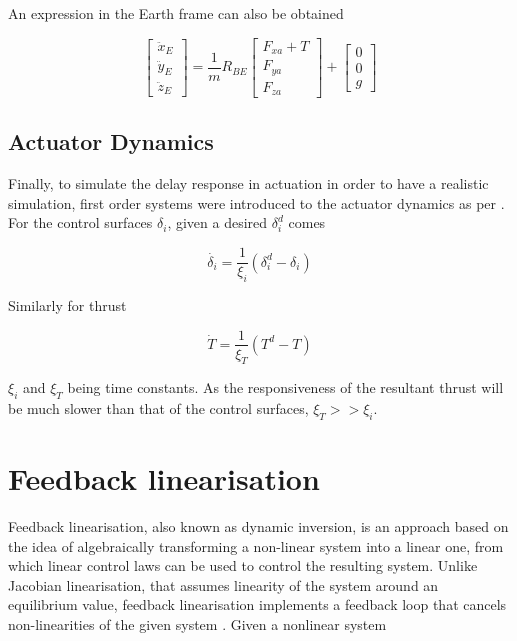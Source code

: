 An expression in the Earth frame can also be obtained

\begin{equation}
\begin{bmatrix}
\ddot{x}_E\\
\ddot{y}_E\\
\ddot{z}_E
\end{bmatrix}
= \dfrac{1}{m} R_{BE}
\begin{bmatrix}
F_{xa}+T\\
F_{ya}\\
F_{za}
\end{bmatrix}
+
\begin{bmatrix}
0\\
0\\
g
\end{bmatrix}
\end{equation}

\subsection{Actuator Dynamics}
\label{section:background/model/actuator_dynamics}

Finally, to simulate the delay response in actuation in order to have a realistic simulation, first order systems were introduced to the actuator dynamics as per \cite{hector}. For the control surfaces $\delta_i$, given a desired $\delta_i^d$ comes

\begin{equation}
\dot{\delta_i} = \dfrac{1}{\xi_i}(\delta_i^d-\delta_i)
\label{eq:actuator_dynamics}
\end{equation}

Similarly for thrust

\begin{equation}
\dot{T} = \dfrac{1}{\xi_T}(T^d-T)
\end{equation}

$\xi_i$ and $\xi_T$ being time constants. As the responsiveness of the resultant thrust will be much slower than that of the control surfaces, $\xi_T>>\xi_i$.
\section{Feedback linearisation}
\label{section:background/NLI}

Feedback linearisation, also known as dynamic inversion, is an approach based on the idea of algebraically transforming a non-linear system into a linear one, from which linear control laws can be used to control the resulting system. Unlike Jacobian linearisation, that assumes linearity of the system around an equilibrium value, feedback linearisation implements a feedback loop that cancels non-linearities of the given system \cite{Slotine+Li}. Given a nonlinear system 

